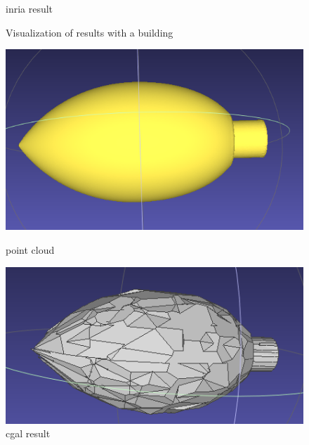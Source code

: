 \documentclass{article}
\begin{document}
\begin{figure}[H]
\begin{minipage}[t]{0.29\textwidth}
  \caption*{inria result}
  \end{minipage}
  \caption{Visualization of results with a building}
  \end{figure}
  \begin{figure}[H]
    \begin{minipage}[t]{0.29\textwidth}
        \includegraphics[width=\textwidth]{../../images/screen_kinetic/flame_point.png}
        \caption*{point cloud}
    \end{minipage}
    \begin{minipage}[t]{0.33\textwidth}
      \includegraphics[width=\textwidth]{../../images/screen_kinetic/flame_cgal.png}
      \caption*{cgal result}
    \end{minipage}
    \begin{minipage}[t]{0.27\textwidth}

\end{minipage}
\end{figure}
\end{document}
